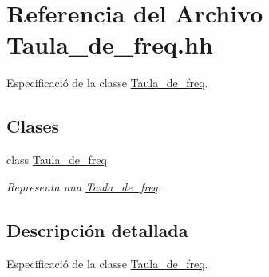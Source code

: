 \hypertarget{_taula__de__freq_8hh}{}\section{Referencia del Archivo Taula\+\_\+de\+\_\+freq.\+hh}
\label{_taula__de__freq_8hh}


Especificació de la classe \hyperlink{class_taula__de__freq}{Taula\+\_\+de\+\_\+freq}.  


\subsection*{Clases}
\begin{DoxyCompactItemize}
\item 
class \hyperlink{class_taula__de__freq}{Taula\+\_\+de\+\_\+freq}
\begin{DoxyCompactList}\small\item\em Representa una \hyperlink{class_taula__de__freq}{Taula\+\_\+de\+\_\+freq}. \end{DoxyCompactList}\end{DoxyCompactItemize}


\subsection{Descripción detallada}
Especificació de la classe \hyperlink{class_taula__de__freq}{Taula\+\_\+de\+\_\+freq}. 

